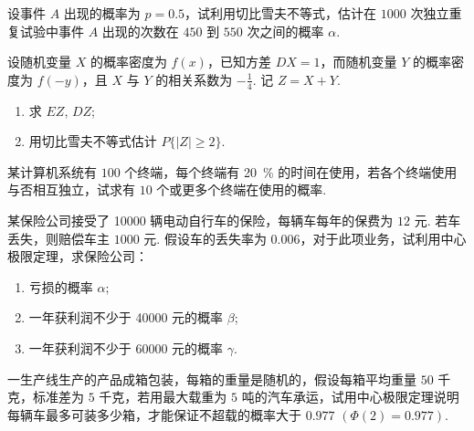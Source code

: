 	\begin{titwo}
		设事件 $A$ 出现的概率为 $p = 0.5$，试利用切比雪夫不等式，估计在 $1000$ 次独立重复试验中事件 $A$ 出现的次数在 $450$ 到 $550$ 次之间的概率 $\alpha$.
	\end{titwo}

	\begin{titwo}
		设随机变量 $X$ 的概率密度为 $f(x)$，已知方差 $DX = 1$，而随机变量 $Y$ 的概率密度为 $f(-y)$，且 $X$ 与 $Y$ 的相关系数为 $-\frac{1}{4}$. 记 $Z = X + Y$.
		\begin{enumerate}
			\item 求 $EZ$, $DZ$;
			\item 用切比雪夫不等式估计 $P\{|Z| \geq 2\}$.
		\end{enumerate}
	\end{titwo}

	\begin{titwo}
		某计算机系统有 $100$ 个终端，每个终端有 \SI{20}{\percent} 的时间在使用，若各个终端使用与否相互独立，试求有 $10$ 个或更多个终端在使用的概率.
	\end{titwo}

	\begin{titwo}
		某保险公司接受了 \num{10000} 辆电动自行车的保险，每辆车每年的保费为 $12$ 元. 若车丢失，则赔偿车主 $1000$ 元. 假设车的丢失率为 $0.006$，对于此项业务，试利用中心极限定理，求保险公司：
		\begin{enumerate}
			\item 亏损的概率 $\alpha$;
			\item 一年获利润不少于 \num{40000} 元的概率 $\beta$;
			\item 一年获利润不少于 \num{60000} 元的概率 $\gamma$.
		\end{enumerate}
	\end{titwo}

	\begin{titwo}
		一生产线生产的产品成箱包装，每箱的重量是随机的，假设每箱平均重量 $50$ 千克，标准差为 $5$ 千克，若用最大载重为 $5$ 吨的汽车承运，试用中心极限定理说明每辆车最多可装多少箱，才能保证不超载的概率大于 $0.977$ $(\varPhi(2) = 0.977)$.
	\end{titwo}